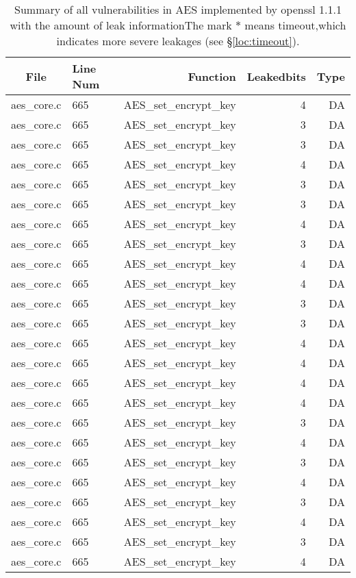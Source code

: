 \begin{table}%
\centering
\caption{Summary of all vulnerabilities in AES implemented by openssl 1.1.1 with the amount of leak informationThe mark $*$ means timeout,which indicates more severe leakages (see \S\ref{loc:timeout}).}\label{tab:AESopenssl}
\begin{tabular}{clrrr}
\hline
\textbf{File} & \textbf{Line Num} & \textbf{Function} & \textbf{Leakedbits} & \textbf{Type} \\\hline
aes\_core.c& 665&AES\_set\_encrypt\_key&4 &DA\\
aes\_core.c& 665&AES\_set\_encrypt\_key&3 &DA\\
aes\_core.c& 665&AES\_set\_encrypt\_key&3 &DA\\
aes\_core.c& 665&AES\_set\_encrypt\_key&4 &DA\\
aes\_core.c& 665&AES\_set\_encrypt\_key&3 &DA\\
aes\_core.c& 665&AES\_set\_encrypt\_key&3 &DA\\
aes\_core.c& 665&AES\_set\_encrypt\_key&4 &DA\\
aes\_core.c& 665&AES\_set\_encrypt\_key&3 &DA\\
aes\_core.c& 665&AES\_set\_encrypt\_key&4 &DA\\
aes\_core.c& 665&AES\_set\_encrypt\_key&4 &DA\\
aes\_core.c& 665&AES\_set\_encrypt\_key&3 &DA\\
aes\_core.c& 665&AES\_set\_encrypt\_key&3 &DA\\
aes\_core.c& 665&AES\_set\_encrypt\_key&4 &DA\\
aes\_core.c& 665&AES\_set\_encrypt\_key&4 &DA\\
aes\_core.c& 665&AES\_set\_encrypt\_key&4 &DA\\
aes\_core.c& 665&AES\_set\_encrypt\_key&4 &DA\\
aes\_core.c& 665&AES\_set\_encrypt\_key&3 &DA\\
aes\_core.c& 665&AES\_set\_encrypt\_key&4 &DA\\
aes\_core.c& 665&AES\_set\_encrypt\_key&3 &DA\\
aes\_core.c& 665&AES\_set\_encrypt\_key&4 &DA\\
aes\_core.c& 665&AES\_set\_encrypt\_key&3 &DA\\
aes\_core.c& 665&AES\_set\_encrypt\_key&4 &DA\\
aes\_core.c& 665&AES\_set\_encrypt\_key&3 &DA\\
aes\_core.c& 665&AES\_set\_encrypt\_key&4 &DA\\

\end{tabular}
\end{table}
